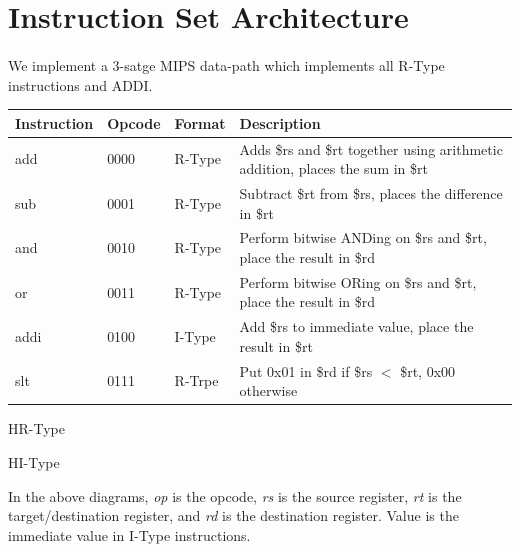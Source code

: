 \documentclass{article}
\newenvironment{problem}[1]{
  \nobreak\section*{#1}
}{}
\begin{document}
  \begin{problem}{Instruction Set Architecture}
    \paragraph{}
    We implement a 3-satge MIPS data-path which implements all R-Type instructions and ADDI.

    \begin{table}[]
      \begin{tabular}{@{}lllp{6.8cm}@{}}
        \toprule
        Instruction & Opcode & Format & Description \\ \midrule
        add & 0000 & R-Type & Adds \$rs and \$rt together using arithmetic addition, places the sum in \$rt \\
        sub & 0001 & R-Type & Subtract \$rt from \$rs, places the difference in \$rt \\
        and & 0010 & R-Type & Perform bitwise ANDing on \$rs and \$rt, place the result in \$rd \\
        or & 0011 & R-Type & Perform bitwise ORing on \$rs and \$rt, place the result in \$rd \\
        addi & 0100 & I-Type & Add \$rs to immediate value, place the result in \$rt \\
        slt & 0111 & R-Trpe & Put 0x01 in \$rd if \$rs $<$ \$rt, 0x00 otherwise \\ \bottomrule
      \end{tabular}
    \end{table}
    
    \begin{register}{H}{R-Type}{}
      \begin{center}
      \end{center}
    \end{register}

    \begin{register}{H}{I-Type}{}
      \begin{center}
      \end{center}
    \end{register}

    In the above diagrams, \emph{op} is the opcode, \emph{rs} is the
    source register, \emph{rt} is the target/destination register, and
    \emph{rd} is the destination register.  Value is the immediate value
    in I-Type instructions.
  \end{problem}
\end{document}
